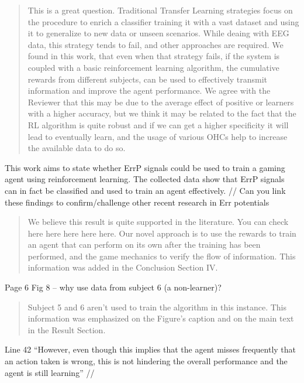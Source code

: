 \documentclass[journal,onecolumn,12pt]{IEEEtran}
\begin{document}
\begin{quotation}
{\color{blue}
This is a great question.  Traditional Transfer Learning strategies focus on the procedure to enrich a classifier training it with a vast dataset and using it to generalize to new data or unseen scenarios.  While deaing with EEG data, this strategy tends to fail, and other approaches are required.  We found in this work, that even when that strategy fails, if the system is coupled with a basic reinforcement learning algorithm, the cumulative rewards from different subjects, can be used to effectively transmit information and improve the agent performance.  We agree with the Reviewer that this may be due to the average effect of positive or learners with a higher accuracy, but we think it may be related to the fact that the RL algorithm is quite robust and if we can get a higher specificity it will lead to eventually learn, and the usage of various OHCs help to increase the available data to do so.
}
\end{quotation}

This work aims to state whether ErrP signals could be used to train a gaming agent using reinforcement learning. The collected data show that ErrP signals can in fact be classified and used to train an agent effectively. // Can you link these findings to confirm/challenge other recent research in Err potentials

\begin{quotation}
{\color{blue}
We believe this result is quite supported in the literature.  You can check here here here here here.  Our novel approach is to use the rewards to train an agent that can perform on its own after the training has been performed, and the game mechanics to verify the flow of information.  This information was added in the Conclusion Section IV.
}
\end{quotation}

Page 6
Fig 8 – why use data from subject 6 (a non-learner)?

\begin{quotation}
{\color{blue}
Subject 5 and 6 aren't used to train the algorithm in this instance. This information was emphasized on the Figure's caption and on the main text in the Result Section.
}
\end{quotation}

Line 42 “However, even though this implies that the agent misses frequently that an action taken is wrong, this is not hindering the overall performance and the agent is still learning” //
\end{document}
